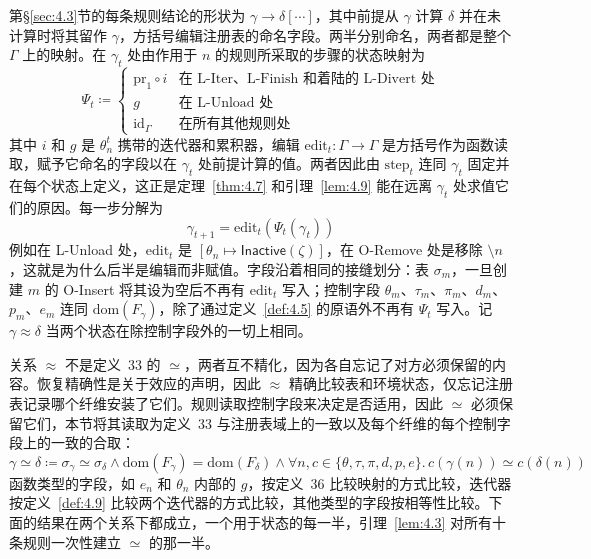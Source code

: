 第\S\ref{sec:4.3}节的每条规则结论的形状为 $\gamma \longrightarrow \delta[\cdots]$，其中前提从 $\gamma$ 计算 $\delta$ 并在未计算时将其留作 $\gamma$，方括号编辑注册表的命名字段。两半分别命名，两者都是整个 $\Gamma$ 上的映射。在 $\gamma_t$ 处由作用于 $n$ 的规则所采取的步骤的状态映射为
\begin{equation}\label{eq:4.18}
\Psi_t \coloneqq \begin{cases}
\mathrm{pr}_1 \circ i & \mbox{在 L-Iter、L-Finish 和着陆的 L-Divert 处} \\
g & \mbox{在 L-Unload 处} \\
\mathrm{id}_\Gamma & \mbox{在所有其他规则处}
\end{cases}
\end{equation}
其中 $i$ 和 $g$ 是 $\theta^t_n$ 携带的迭代器和累积器，编辑 $\mathrm{edit}_t: \Gamma \to \Gamma$ 是方括号作为函数读取，赋予它命名的字段以在 $\gamma_t$ 处前提计算的值。两者因此由 $\mathrm{step}_t$ 连同 $\gamma_t$ 固定并在每个状态上定义，这正是定理~\ref{thm:4.7} 和引理~\ref{lem:4.9} 能在远离 $\gamma_t$ 处求值它们的原因。每一步分解为
\begin{equation}\label{eq:4.19}
\gamma_{t+1} = \mathrm{edit}_t(\Psi_t(\gamma_t))
\end{equation}
例如在 L-Unload 处，$\mathrm{edit}_t$ 是 $[\theta_n \mapsto \mathsf{Inactive}(\zeta)]$，在 O-Remove 处是移除 $\setminus n$，这就是为什么后半是编辑而非赋值。字段沿着相同的接缝划分：表 $\sigma_m$，一旦创建 $m$ 的 O-Insert 将其设为空后不再有 $\mathrm{edit}_t$ 写入；控制字段 $\theta_m$、$\tau_m$、$\pi_m$、$d_m$、$p_m$、$e_m$ 连同 $\mathrm{dom}(F_\gamma)$，除了通过定义~\ref{def:4.5} 的原语外不再有 $\Psi_t$ 写入。记 $\gamma \approx \delta$ 当两个状态在除控制字段外的一切上相同。

关系 $\approx$ 不是定义~33 的 $\simeq$，两者互不精化，因为各自忘记了对方必须保留的内容。恢复精确性是关于效应的声明，因此 $\approx$ 精确比较表和环境状态，仅忘记注册表记录哪个纤维安装了它们。规则读取控制字段来决定是否适用，因此 $\simeq$ 必须保留它们，本节将其读取为定义~33 与注册表域上的一致以及每个纤维的每个控制字段上的一致的合取：
\begin{equation}\label{eq:4.20}
\gamma \simeq \delta \coloneqq \sigma_\gamma \simeq \sigma_\delta \land \mathrm{dom}(F_\gamma) = \mathrm{dom}(F_\delta) \land \forall n, c \in \{\theta, \tau, \pi, d, p, e\}.\, c(\gamma(n)) \simeq c(\delta(n))
\end{equation}
函数类型的字段，如 $e_n$ 和 $\theta_n$ 内部的 $g$，按定义~36 比较映射的方式比较，迭代器按定义~\ref{def:4.9} 比较两个迭代器的方式比较，其他类型的字段按相等性比较。下面的结果在两个关系下都成立，一个用于状态的每一半，引理~\ref{lem:4.3} 对所有十条规则一次性建立 $\simeq$ 的那一半。


